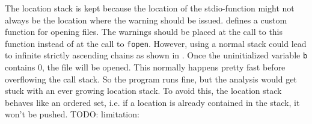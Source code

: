 The location stack is kept because the location of the stdio-function might not always be the location where the warning should be issued.  defines a custom function for opening files. The warnings should be placed at the call to this function instead of at the call to \verb|fopen|.
However, using a normal stack could lead to infinite strictly ascending chains as shown in . Once the uninitialized variable \verb|b| contains 0, the file will be opened. This normally happens pretty fast before overflowing the call stack. So the program runs fine, but the analysis would get stuck with an ever growing location stack. To avoid this, the location stack behaves like an ordered set, i.e. if a location is already contained in the stack, it won't be pushed. %
TODO: limitation: %


